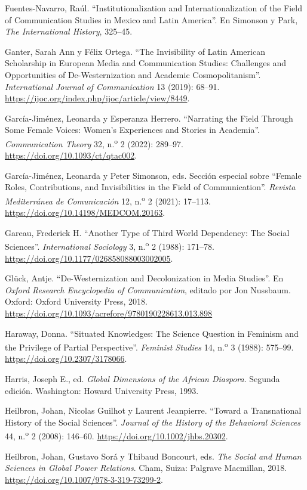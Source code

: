 \documentclass{tufte-handout}
\begin{document}
\begin{hangparas}{.25in}{1}
Fuentes-Navarro, Raúl. ``Institutionalization and Internationalization
of the Field of Communication Studies in Mexico and Latin America''. En
Simonson y Park, \emph{The International History}, 325--45.

Ganter, Sarah Ann y Félix Ortega. ``The Invisibility of Latin American
Scholarship in European Media and Communication Studies: Challenges and
Opportunities of De-Westernization and Academic Cosmopolitanism''.
\emph{International Journal of Communication} 13 (2019): 68--91.
\url{https://ijoc.org/index.php/ijoc/article/view/8449}.

García-Jiménez, Leonarda y Esperanza Herrero. ``Narrating the Field
Through Some Female Voices: Women's Experiences and Stories in
Academia''. \emph{Communication Theory} 32, n.\textsuperscript{o} 2
(2022): 289--97. \url{https://doi.org/10.1093/ct/qtac002}.

García-Jiménez, Leonarda y Peter Simonson, eds. Sección especial sobre
``Female Roles, Contributions, and Invisibilities in the Field of
Communication''. \emph{Revista Mediterránea de Comunicación} 12,
n.\textsuperscript{o} 2 (2021): 17--113.
\url{https://doi.org/10.14198/MEDCOM.20163}.

Gareau, Frederick H. ``Another Type of Third World Dependency: The
Social Sciences''. \emph{International Sociology} 3,
n.\textsuperscript{o} 2 (1988): 171--78.
\url{https://doi.org/10.1177/026858088003002005}.

Glück, Antje. ``De-Westernization and Decolonization in Media Studies''.
En \emph{Oxford Research Encyclopedia of Communication}, editado por Jon
Nussbaum. Oxford: Oxford University Press, 2018.
\url{https://doi.org/10.1093/acrefore/9780190228613.013.898}

Haraway, Donna. ``Situated Knowledges: The Science Question in Feminism
and the Privilege of Partial Perspective''. \emph{Feminist Studies} 14,
n.\textsuperscript{o} 3 (1988): 575--99.
\url{https://doi.org/10.2307/3178066}.

Harris, Joseph E., ed. \emph{Global Dimensions of the African Diaspora}.
Segunda edición. Washington: Howard University Press, 1993.

Heilbron, Johan, Nicolas Guilhot y Laurent Jeanpierre. ``Toward a
Transnational History of the Social Sciences''. \emph{Journal of the
History of the Behavioral Sciences} 44, n.\textsuperscript{o} 2 (2008):
146--60. \url{https://doi.org/10.1002/jhbs.20302}.

Heilbron, Johan, Gustavo Sorá y Thibaud Boncourt, eds. \emph{The Social
and Human Sciences in Global Power Relations}. Cham, Suiza: Palgrave
Macmillan, 2018. \url{https://doi.org/10.1007/978-3-319-73299-2}.


\end{hangparas}
\end{document}
